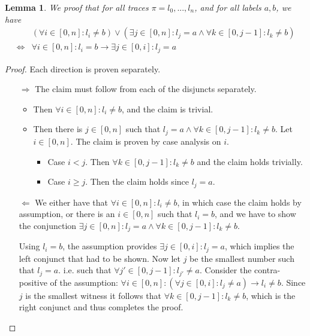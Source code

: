 \documentclass[a4paper,10pt]{scrartcl}
\newtheorem{lemma}{Lemma}
\newcommand{\tr}{\ensuremath{l_0,...,l_n}}
\newcommand{\impl}{\ensuremath{\rightarrow}}
\begin{document}
\begin{lemma}
We proof that for all traces $\pi=\tr$, and for all labels $a,b$, we have
\begin{align*}
     &(\forall{i\in[0,n]}:l_i\not=b)\lor(\exists{j\in[0,n]}:l_j={a}\land\forall{k\in[0,j-1]:l_k\not={b}})\\
 \iff&\forall{i\in[0,n]}:l_i=b\impl\exists{j\in[0,i]}:l_j={a}
\end{align*}

 \label{lem1}
\end{lemma}
\begin{proof} Each direction is proven separately.
 \begin{itemize}
  \item[$\Rightarrow$] 
   The claim must follow from each of the disjuncts separately.
   \begin{itemize}
    \item Then $\forall{i\in[0,n]}:l_i\not=b$, and the claim is trivial.
    \item Then there is ${j\in[0,n]}$ such that $l_j={a}\land\forall{k\in[0,j-1]:l_k\not={b}}$. Let $i\in[0,n]$. The claim is proven by case analysis on $i$. 
    \begin{itemize}
     \item Case $i<j$. Then $\forall{k\in[0,j-1]:l_k\not={b}}$ and the claim holds trivially. 
     \item Case $i\geq{}j$. Then the claim holds since $l_j=a$.
    \end{itemize}
   \end{itemize}
   \item[$\Leftarrow$]
   We either have that $\forall{i\in[0,n]}:l_i\not=b$, in which case the claim holds by assumption, or there is an ${i\in[0,n]}$ such that $l_i=b$, and we 
   have to show the conjunction $\exists{j\in[0,n]}:l_j={a}\land\forall{k\in[0,j-1]:l_k\not={b}}$.

   Using $l_i=b$, the assumption provides $\exists{j\in[0,i]}:l_j={a}$, which implies the left conjunct that had to be shown. Now let $j$ be the smallest number such 
   that $l_j=a$. i.e. such that $\forall{j'}\in[0,j-1]:l_{j'}\not=a$. Consider the contra-positive of
   the assumption: $\forall{i\in[0,n]}:(\forall{j\in[0,i]}:l_j\not={a})\impl{}l_i\not=b$. Since $j$ is the smallest witness it follows that 
   $\forall{k\in[0,j-1]}:l_k\not=b$, which is the right conjunct and thus completes the proof.
 \end{itemize}
\end{proof}
\end{document}
